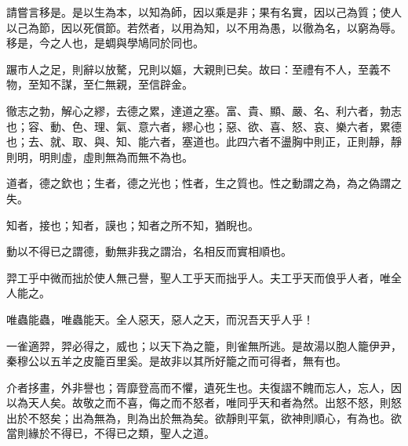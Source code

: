 \begin{pinyinscope}
請嘗言移是。是以生為本，以知為師，因以乘是非；果有名實，因以己為質；使人以己為節，因以死償節。若然者，以用為知，以不用為愚，以徹為名，以窮為辱。移是，今之人也，是蜩與學鳩同於同也。

蹍市人之足，則辭以放驁，兄則以嫗，大親則已矣。故曰：至禮有不人，至義不物，至知不謀，至仁無親，至信辟金。

徹志之勃，解心之繆，去德之累，達道之塞。富、貴、顯、嚴、名、利六者，勃志也；容、動、色、理、氣、意六者，繆心也；惡、欲、喜、怒、哀、樂六者，累德也；去、就、取、與、知、能六者，塞道也。此四六者不盪胸中則正，正則靜，靜則明，明則虛，虛則無為而無不為也。

道者，德之欽也；生者，德之光也；性者，生之質也。性之動謂之為，為之偽謂之失。

知者，接也；知者，謨也；知者之所不知，猶睨也。

動以不得已之謂德，動無非我之謂治，名相反而實相順也。

羿工乎中微而拙於使人無己譽，聖人工乎天而拙乎人。夫工乎天而俍乎人者，唯全人能之。

唯蟲能蟲，唯蟲能天。全人惡天，惡人之天，而況吾天乎人乎！

一雀適羿，羿必得之，威也；以天下為之籠，則雀無所逃。是故湯以胞人籠伊尹，秦穆公以五羊之皮籠百里奚。是故非以其所好籠之而可得者，無有也。

介者拸畫，外非譽也；胥靡登高而不懼，遺死生也。夫復謵不餽而忘人，忘人，因以為天人矣。故敬之而不喜，侮之而不怒者，唯同乎天和者為然。出怒不怒，則怒出於不怒矣；出為無為，則為出於無為矣。欲靜則平氣，欲神則順心，有為也。欲當則緣於不得已，不得已之類，聖人之道。


\end{pinyinscope}